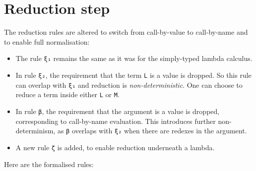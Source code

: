\hypertarget{reduction-step}{%
\section{Reduction step}\label{reduction-step}}

The reduction rules are altered to switch from call-by-value to
call-by-name and to enable full normalisation:

\begin{itemize}
\item
  The rule \texttt{ξ₁} remains the same as it was for the simply-typed
  lambda calculus.
\item
  In rule \texttt{ξ₂}, the requirement that the term \texttt{L} is a
  value is dropped. So this rule can overlap with \texttt{ξ₁} and
  reduction is \emph{non-deterministic}. One can choose to reduce a term
  inside either \texttt{L} or \texttt{M}.
\item
  In rule \texttt{β}, the requirement that the argument is a value is
  dropped, corresponding to call-by-name evaluation. This introduces
  further non-determinism, as \texttt{β} overlaps with \texttt{ξ₂} when
  there are redexes in the argument.
\item
  A new rule \texttt{ζ} is added, to enable reduction underneath a
  lambda.
\end{itemize}

Here are the formalised rules:

